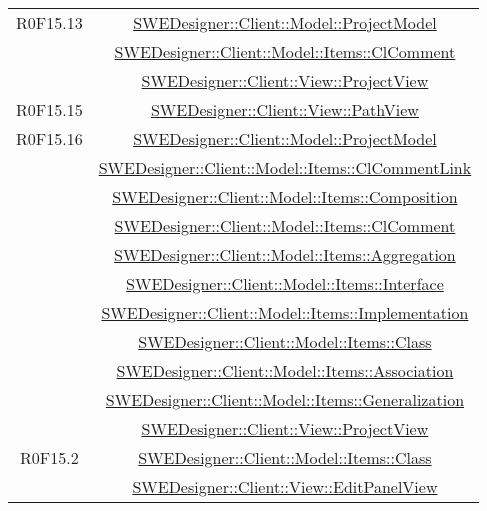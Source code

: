 \documentclass[../DefinizioneDiProdotto.tex]{subfiles}
\begin{document}
\begin{longtable}{|c|c|}
				R0F15.13
				& \hyperlink{SWEDesigner::Client::Model::ProjectModel}{SWEDesigner::Client::Model::ProjectModel}\\
				& \hyperlink{SWEDesigner::Client::Model::Items::ClComment}{SWEDesigner::Client::Model::Items::ClComment}\\
				& \hyperlink{SWEDesigner::Client::View::ProjectView}{SWEDesigner::Client::View::ProjectView}\\
				\hline

				R0F15.15
				& \hyperlink{SWEDesigner::Client::View::PathView}{SWEDesigner::Client::View::PathView}\\
				\hline

				R0F15.16
				& \hyperlink{SWEDesigner::Client::Model::ProjectModel}{SWEDesigner::Client::Model::ProjectModel}\\
				& \hyperlink{SWEDesigner::Client::Model::Items::ClCommentLink}{SWEDesigner::Client::Model::Items::ClCommentLink}\\
				& \hyperlink{SWEDesigner::Client::Model::Items::Composition}{SWEDesigner::Client::Model::Items::Composition}\\
				& \hyperlink{SWEDesigner::Client::Model::Items::ClComment}{SWEDesigner::Client::Model::Items::ClComment}\\
				& \hyperlink{SWEDesigner::Client::Model::Items::Aggregation}{SWEDesigner::Client::Model::Items::Aggregation}\\
				& \hyperlink{SWEDesigner::Client::Model::Items::Interface}{SWEDesigner::Client::Model::Items::Interface}\\
				& \hyperlink{SWEDesigner::Client::Model::Items::Implementation}{SWEDesigner::Client::Model::Items::Implementation}\\
				& \hyperlink{SWEDesigner::Client::Model::Items::Class}{SWEDesigner::Client::Model::Items::Class}\\
				& \hyperlink{SWEDesigner::Client::Model::Items::Association}{SWEDesigner::Client::Model::Items::Association}\\
				& \hyperlink{SWEDesigner::Client::Model::Items::Generalization}{SWEDesigner::Client::Model::Items::Generalization}\\
				& \hyperlink{SWEDesigner::Client::View::ProjectView}{SWEDesigner::Client::View::ProjectView}\\
				\hline

				R0F15.2
				& \hyperlink{SWEDesigner::Client::Model::Items::Class}{SWEDesigner::Client::Model::Items::Class}\\
				& \hyperlink{SWEDesigner::Client::View::EditPanelView}{SWEDesigner::Client::View::EditPanelView}\\
				\hline


\end{longtable}
\end{document}
